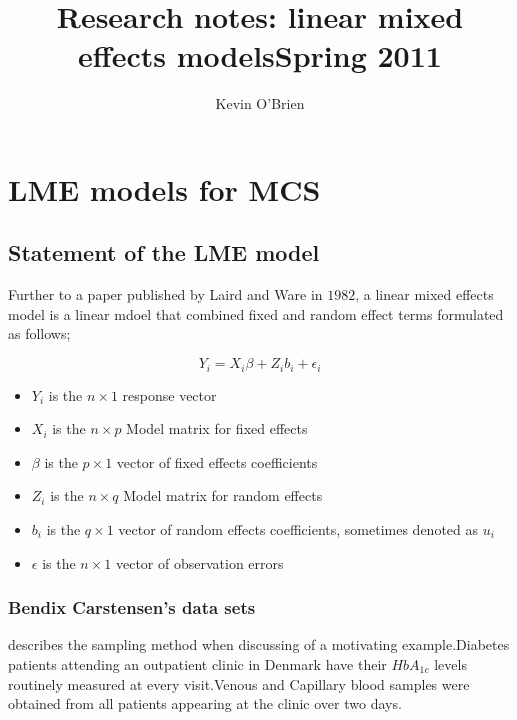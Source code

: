 \documentclass[12pt, a4paper]{report}
\title{Research notes: linear mixed effects models}
\author{ } \date{ }
\theoremstyle{plain}
\theoremstyle{definition}
\theoremstyle{remark}
\begin{document}
\author{Kevin O'Brien}
\title{Spring 2011}



\newpage
\chapter{LME models for MCS}
\section{Statement of the LME model}

Further to a paper published by Laird and Ware in $1982$, a linear mixed effects model is a linear mdoel that combined fixed and random effect terms formulated as follows;

  \begin{displaymath}
      Y_{i} =X_{i}\beta + Z_{i}b_{i} + \epsilon_{i}
  \end{displaymath}
\begin{itemize}

\item $Y_{i}$ is the $n \times 1$ response vector \item $X_{i}$ is
the $n \times p$ Model matrix for fixed effects \item $\beta$ is
the $p \times 1$ vector of fixed effects coefficients \item
$Z_{i}$ is the $n \times q$ Model matrix for random effects \item
$b_{i}$ is the $q \times 1$ vector of random effects coefficients,
sometimes denoted as $u_{i}$ \item $\epsilon$ is the $n \times 1$
vector of observation errors
\end{itemize}






\newpage

\subsection{Bendix Carstensen's data sets}
\citet{bxc2008}describes the sampling method when discussing of a motivating example.Diabetes patients attending an outpatient clinic in Denmark have their $HbA_{1c}$ levels routinely measured at every visit.Venous and Capillary blood samples were obtained from all patients appearing at the clinic over two days.
\end{document}
